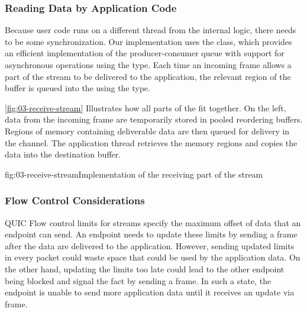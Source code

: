 \subsubsection{Reading Data by Application Code}

Because user code runs on a different thread from the internal \QuicConnection{} logic, there needs
to be some synchronization. Our implementation uses the \ChannelOf{} class, which provides an
efficient implementation of the producer-consumer queue with support for asynchronous operations
using the \ValueTaskOf{} type. Each time an incoming \STREAM{} frame allows a part of the
stream to be delivered to the application, the relevant region of the buffer is queued into the
\ChannelOf{} using the \MemoryOf{\byte{}} type.





\autoref{fig:03-receive-stream} Illustrates how all parts of the \ReceiveStream{} fit together. On
the left, data from the incoming \STREAM{} frame are temporarily stored in pooled reordering
buffers. Regions of memory containing deliverable data are then queued for delivery in the channel.
The application thread retrieves the memory regions and copies the data into the destination buffer.

\begin{myFigure}{fig:03-receive-stream}{Implementation of the receiving part of the stream}

  \resizebox{\linewidth}{!}{}

\end{myFigure}

\subsubsection{Flow Control Considerations}

QUIC Flow control limits for streams specify the maximum offset of data that an endpoint can send.
An endpoint needs to update these limits by sending a \MAXSTREAMDATA{} frame after the data are
delivered to the application. However, sending updated limits in every packet could waste space that
could be used by the application data. On the other hand, updating the limits too late could lead to
the other endpoint being blocked and signal the fact by sending a \STREAMDATABLOCKED{} frame. In
such a state, the endpoint is unable to send more application data until it receives an update via
\MAXSTREAMDATA{} frame.

